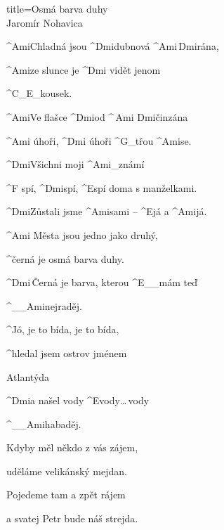 \begin{song}{title=\predtitle\centering Osmá barva duhy \\\large Jaromír Nohavica  \vspace*{-0.3cm}}  %
\begin{centerjustified}
\nejnejvetsi

\begin{varwidth}[t]{0.48\textwidth}\setlength{\parindent}{0.45cm}  %
\sloka
	^{Ami\z}Chladná jsou ^{Dmi\z}dubnová ^{Ami\,Dmi}rána,
	
	^{Ami}ze slunce je ^{Dmi\,\,}vidět jenom 

	^{C{\color{white}\_}E{\color{white}\_}}kousek.
	
	^{Ami}Ve flašce ^{Dmi}od ^{\,Ami\,\,Dmi}činzána
	
	^{Ami\,\,}úhoři, ^{Dmi\,\,}úhoři ^{G{\color{white}\_}}třou ^{Ami}se.
	
	^{Dmi\z}Všichni moji ^{Ami{\color{white}\_}}známí
	
	^{F\,\,}spí, ^{Dmi}spí, ^{E}spí doma s manželkami.
	
	^{Dmi\z}Zůstali jsme ^{Ami}sami{} {--} ^{E}já a ^{Ami}já. 
	
	^{Ami\,\,}Města jsou jedno jako druhý,
	
	^{\phantom{.}}černá je osmá barva duhy.
	
	^{Dmi\,}Černá je barva, kterou ^{E{\color{white}\_\_}}mám teď 

	^{{\color{white}\_\_}Ami}nejraděj.
	
	^{\phantom{.}}Jó, je to bída, je to bída,
	
	^{\phantom{.}}hledal jsem ostrov jménem 

	Atlantýda
	
	^{Dmi}a našel vody ^{E}vody\elipsa\dots\,vody 

	^{{\color{white}\_\_}Ami}habaděj.
	

\end{varwidth}\mezisloupci\begin{varwidth}[t]{0.48\textwidth}\setlength{\parindent}{0.45cm}
\vspace*{0.465cm}
\sloka
	Kdyby měl někdo z vás zájem,
	
	uděláme velikánský mejdan.
	
	Pojedeme tam a zpět rájem
	
	a svatej Petr bude náš strejda.


\end{varwidth}
\end{centerjustified}
\end{song}
